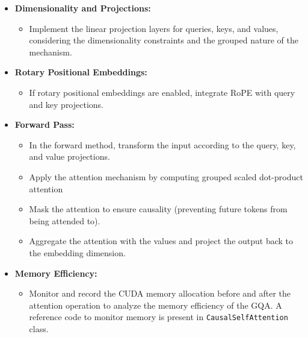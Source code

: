 \documentclass[11pt,addpoints,answers]{exam}
\begin{document}
\begin{questions}
\begin{parts}
{\begin{itemize}
    \item \textbf{Dimensionality and Projections:}
    \begin{itemize}
        \item Implement the linear projection layers for queries, keys, and values, considering the dimensionality constraints and the grouped nature of the mechanism.
    \end{itemize}

    \item \textbf{Rotary Positional Embeddings:}
    \begin{itemize}
        \item If rotary positional embeddings are enabled, integrate RoPE with query and key projections. 
    \end{itemize}
    
    \item \textbf{Forward Pass:}
    \begin{itemize}
        \item In the forward method, transform the input according to the query, key, and value projections.
        \item Apply the attention mechanism by computing grouped scaled dot-product attention
        \item Mask the attention to ensure causality (preventing future tokens from being attended to).
        \item Aggregate the attention with the values and project the output back to the embedding dimension.
    \end{itemize}
    
    \item \textbf{Memory Efficiency:}
    \begin{itemize}
        \item Monitor and record the CUDA memory allocation before and after the attention operation to analyze the memory efficiency of the GQA. A reference code to monitor memory is present in \lstinline{CausalSelfAttention} class.
    \end{itemize}
    
    \end{itemize}

}
    
\clearpage



\end{parts}
\end{questions}
\end{document}
